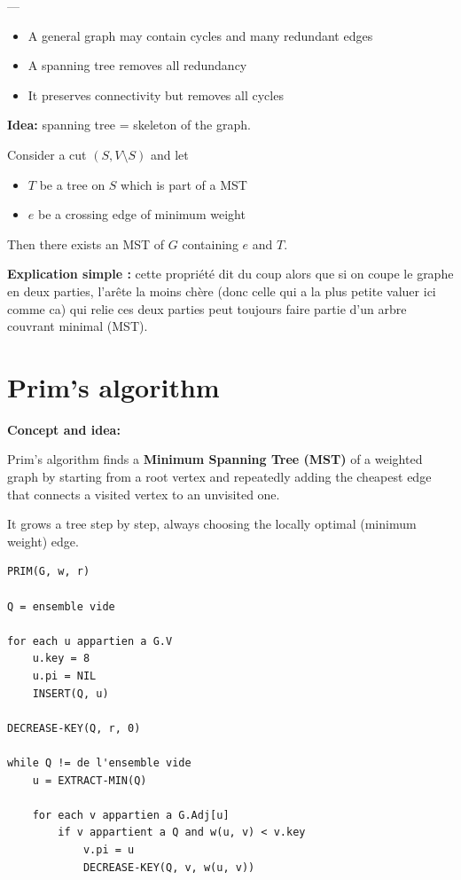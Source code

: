 \documentclass[11pt,a4paper,openany]{book}
\begin{document}
---

\begin{defnbox}[title=Spanning Tree vs General Graph]
\begin{itemize}
    \item A general graph may contain cycles and many redundant edges
    \item A spanning tree removes all redundancy
    \item It preserves connectivity but removes all cycles
\end{itemize}

\textbf{Idea:} spanning tree = skeleton of the graph.
\end{defnbox}



\begin{defnbox}[title=Cut Property]
Consider a cut $(S, V \setminus S)$ and let
\begin{itemize}
    \item $T$ be a tree on $S$ which is part of a MST
    \item $e$ be a crossing edge of minimum weight
\end{itemize}

Then there exists an MST of $G$ containing $e$ and $T$.

\textbf{Explication simple :} cette propriété dit du coup alors que si on coupe le graphe en deux parties, l'arête la moins chère (donc celle qui a la plus petite valuer ici comme ca) qui relie ces deux parties peut toujours faire partie d’un arbre couvrant minimal (MST).
\end{defnbox}



\vspace{2cm}





\section{Prim's algorithm}


\textbf{Concept and idea:}

Prim’s algorithm finds a \textbf{Minimum Spanning Tree (MST)} of a weighted graph by starting from a root vertex and repeatedly adding the cheapest edge that connects a visited vertex to an unvisited one.

It grows a tree step by step, always choosing the locally optimal (minimum weight) edge.

\begin{lstlisting}
PRIM(G, w, r)

Q = ensemble vide

for each u appartien a G.V
    u.key = 8
    u.pi = NIL
    INSERT(Q, u)

DECREASE-KEY(Q, r, 0)

while Q != de l'ensemble vide
    u = EXTRACT-MIN(Q)

    for each v appartien a G.Adj[u]
        if v appartient a Q and w(u, v) < v.key
            v.pi = u
            DECREASE-KEY(Q, v, w(u, v))
\end{lstlisting}
\end{document}
